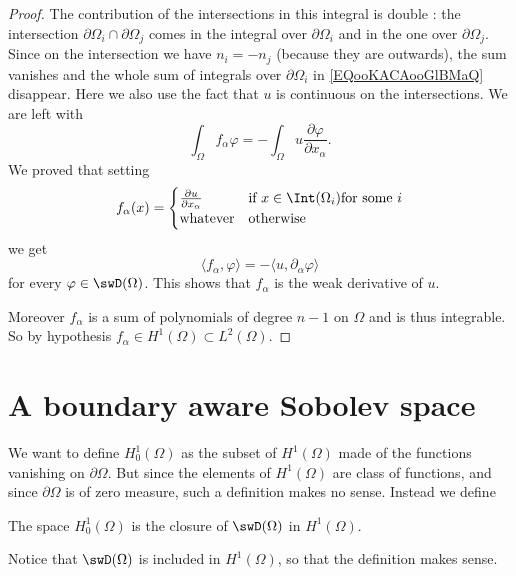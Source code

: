 \begin{proof}
    The contribution of the intersections in this integral is double : the intersection \( \partial\Omega_i\cap\partial\Omega_j\) comes in the integral over \( \partial\Omega_i\) and in the one over \( \partial\Omega_j\). Since on the intersection we have \( n_i=-n_j\) (because they are outwards), the sum vanishes and the whole sum of integrals over \( \partial\Omega_i\) in \eqref{EQooKACAooGlBMaQ} disappear. Here we also use the fact that \( u\) is continuous on the intersections. We are left with
    \begin{equation}
        \int_{\Omega}f_{\alpha}\varphi=-\int_{\Omega}u\frac{ \partial \varphi }{ \partial x_{\alpha} }. 
    \end{equation}
    We proved that setting
    \begin{equation}
        f_{\alpha}(x)=\begin{cases}
            \frac{ \partial u }{ \partial x_{\alpha} }    &   \text{if } x\in\Int(\Omega_i) \text{for some }i\\
            \text{whatever}    &    \text{otherwise }
        \end{cases}
    \end{equation}
    we get
    \begin{equation}
        \langle f_{\alpha}, \varphi\rangle =-\langle u, \partial_{\alpha}\varphi\rangle 
    \end{equation}
    for every \( \varphi\in\swD(\Omega)\). This shows that \( f_{\alpha}\) is the weak derivative of \( u\). 

    Moreover \( f_{\alpha}\) is a sum of polynomials of degree \( n-1\) on \( \Omega\) and is thus integrable. So by hypothesis \( f_{\alpha}\in H^1(\Omega)\subset L^2(\Omega)\).
\end{proof}

\section{A boundary aware Sobolev space}

We want to define \( H_0^1(\Omega)\) as the subset of \( H^1(\Omega)\) made of the functions vanishing on \( \partial \Omega\).  But since the elements of \( H^1(\Omega)\) are class of functions, and since \( \partial\Omega\) is of zero measure, such a definition makes no sense. Instead we define
\begin{definition}      \label{DEFooFICWooBWCDyO}
    The space \( H^1_0(\Omega)\) is the closure of \( \swD(\Omega)\) in \( H^1(\Omega)\).
\end{definition}
Notice that \( \swD(\Omega)\) is included in \( H^1(\Omega)\), so that the definition makes sense.

